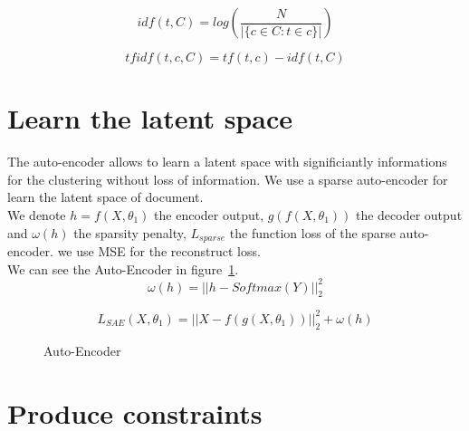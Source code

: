 \documentclass{article}
\begin{document}
\begin{equation}\label{eq:idf}
  idf(t, C) = log(\frac{N}{| \{ c \in C : t \in c \}  |})
\end{equation}

\begin{equation}\label{eq:tfidf}
  tfidf(t,c,C) = tf(t,c) - idf(t,C)
\end{equation}


\section{Learn the latent space}

The auto-encoder allows to learn a latent space with significiantly
informations for the clustering without loss of information.
We use a sparse auto-encoder for learn the latent space of document.
\\
We denote $h=f(X, \theta_1)$ the encoder output, $g(f(X, \theta_1))$
the decoder output and $\omega(h)$ the sparsity penalty, $L_{sparse}$
the function loss of the sparse auto-encoder. we use MSE for
the reconstruct loss.
\\
We can see the Auto-Encoder in figure~\ref{fig:archi}.
\begin{equation}\label{eq:omega}
  \omega(h) = || h - Softmax(Y)||_2^2
\end{equation}

\begin{equation}\label{eq:Sparse}
  L_{SAE}(X, \theta_1) = ||X - f(g(X, \theta_1))||_2^2 + \omega(h)  
\end{equation}

\begin{figure}[!t]
  \centering
  
  \caption{Auto-Encoder}
  \label{fig:archi}
\end{figure}

\section{Produce constraints}
\end{document}
